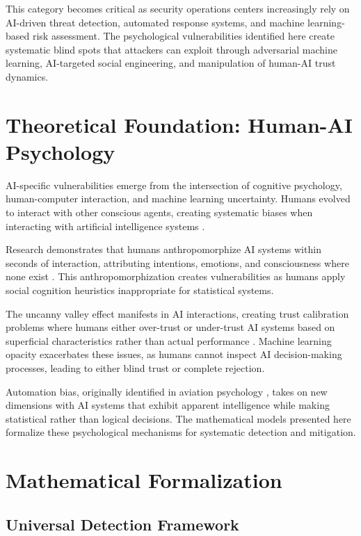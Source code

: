 \documentclass[11pt,a4paper]{article}
\begin{document}
This category becomes critical as security operations centers increasingly rely on AI-driven threat detection, automated response systems, and machine learning-based risk assessment. The psychological vulnerabilities identified here create systematic blind spots that attackers can exploit through adversarial machine learning, AI-targeted social engineering, and manipulation of human-AI trust dynamics.

\section{Theoretical Foundation: Human-AI Psychology}

AI-specific vulnerabilities emerge from the intersection of cognitive psychology, human-computer interaction, and machine learning uncertainty. Humans evolved to interact with other conscious agents, creating systematic biases when interacting with artificial intelligence systems \cite{reeves1996}.

Research demonstrates that humans anthropomorphize AI systems within seconds of interaction, attributing intentions, emotions, and consciousness where none exist \cite{waytz2014}. This anthropomorphization creates vulnerabilities as humans apply social cognition heuristics inappropriate for statistical systems.

The uncanny valley effect manifests in AI interactions, creating trust calibration problems where humans either over-trust or under-trust AI systems based on superficial characteristics rather than actual performance \cite{mori1970}. Machine learning opacity exacerbates these issues, as humans cannot inspect AI decision-making processes, leading to either blind trust or complete rejection.

Automation bias, originally identified in aviation psychology \cite{parasuraman1997}, takes on new dimensions with AI systems that exhibit apparent intelligence while making statistical rather than logical decisions. The mathematical models presented here formalize these psychological mechanisms for systematic detection and mitigation.

\section{Mathematical Formalization}

\subsection{Universal Detection Framework}
\end{document}
